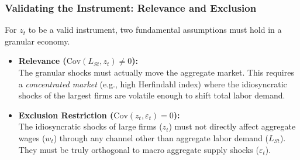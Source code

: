 \documentclass[aspectratio=169,11pt]{beamer}
\begin{document}
\begin{frame}
    \frametitle{Validating the Instrument: Relevance and Exclusion}

    \vspace{0.3cm}
    {\Large
        For $z_t$ to be a valid instrument, two fundamental assumptions must hold in a granular economy.
    }

    \vspace{0.8cm}
    \begin{itemize}
        \item \textbf{Relevance ($\text{Cov}(L_{St}, z_t) \neq 0$):}\\
        \vspace{0.2cm}
        The granular shocks must actually move the aggregate market. This requires a \emph{concentrated market} (e.g., high Herfindahl index) where the idiosyncratic shocks of the largest firms are volatile enough to shift total labor demand.

        \vspace{0.6cm}
        \item \textbf{Exclusion Restriction ($\text{Cov}(z_t, \varepsilon_t) = 0$):}\\
        \vspace{0.2cm}
        The idiosyncratic shocks of large firms ($z_t$) must not directly affect aggregate wages ($w_t$) through any channel other than aggregate labor demand ($L_{St}$). They must be truly orthogonal to macro aggregate supply shocks ($\varepsilon_t$).
    \end{itemize}

\end{frame}
\end{document}

